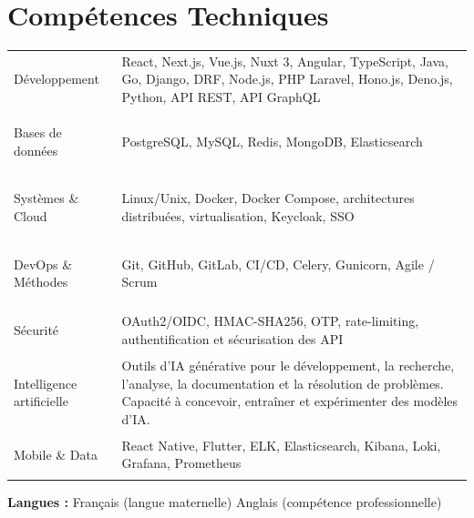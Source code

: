 \documentclass[10pt,a4paper]{article}
\begin{document}
\section{Compétences Techniques}

\begin{tabularx}{\linewidth}{
    @{}
    >{\bfseries\raggedright\arraybackslash}p{3.0cm}
    @{\hspace{8pt}}
    >{\raggedright\arraybackslash}X
    @{}
}

Développement &
React, Next.js, Vue.js, Nuxt 3, Angular,
TypeScript, Java, Go, Django, DRF, Node.js,
PHP Laravel, Hono.js, Deno.js, Python,
API REST, API GraphQL
\\[3pt]

Bases de données &
PostgreSQL, MySQL, Redis, MongoDB,
Elasticsearch
\\[3pt]

Systèmes \& Cloud &
Linux/Unix, Docker, Docker Compose,
architectures distribuées, virtualisation,
Keycloak, SSO
\\[3pt]

DevOps \& Méthodes &
Git, GitHub, GitLab, CI/CD, Celery,
Gunicorn, Agile / Scrum
\\[3pt]

Sécurité &
OAuth2/OIDC, HMAC-SHA256, OTP,
rate-limiting, authentification et sécurisation
des API
\\[3pt]

Intelligence artificielle &
Outils d'IA générative pour le développement,
la recherche, l'analyse, la documentation et
la résolution de problèmes.
Capacité à concevoir, entraîner et
expérimenter des modèles d'IA.
\\[3pt]

Mobile \& Data &
React Native, Flutter, ELK, Elasticsearch,
Kibana, Loki, Grafana, Prometheus

\end{tabularx}


\vspace{4pt}

\noindent
\textbf{Langues :}
Français (langue maternelle)
\quad
\textbullet
\quad
Anglais (compétence professionnelle)

\end{document}
